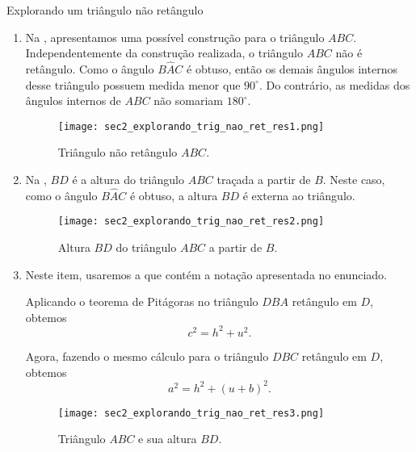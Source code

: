 \begin{answer}{Explorando um triângulo não retângulo}
{
\begin{enumerate}
    \item{}
    Na  , apresentamos uma possível construção para o triângulo $ABC$. Independentemente da construção realizada, o triângulo $ABC$ não é retângulo. Como o ângulo $B\hat{A}C$ é obtuso, então os demais ângulos internos desse triângulo possuem medida menor que $90^\circ$. Do contrário, as medidas dos ângulos internos de $ABC$ não somariam $180^\circ$.
    
    \begin{figure}[H]
    \centering
    \texttt{[image: sec2\_explorando\_trig\_nao\_ret\_res1.png]}
    \caption{Triângulo não retângulo $ABC$.}
    \label{sec2_trignaoret_resl_fig}
\end{figure}
    
    \item{}
    Na , $BD$ é a  altura do triângulo $ABC$ traçada a partir de $B$. Neste caso, como o ângulo $B\hat{A}C$ é obtuso, a altura $BD$ é externa ao triângulo.
    \begin{figure}[H]
    \centering
    \texttt{[image: sec2\_explorando\_trig\_nao\_ret\_res2.png]}
    \caption{Altura $BD$ do triângulo $ABC$ a partir de $B$.}
    \label{sec2_trignaoret_res2_fig}
\end{figure}
    
    \item{}
    Neste item, usaremos a   que contém a notação apresentada no enunciado.
   
    Aplicando o teorema de Pitágoras no triângulo $DBA$ retângulo em $D$, obtemos 
    \begin{equation}
     c^2=h^2+u^2.   \label{sec2_at_trignaoret_eq1}
    \end{equation}
    
    Agora, fazendo o mesmo cálculo para o triângulo $DBC$ retângulo em $D$, obtemos 
    \begin{equation}
     a^2=h^2+(u+b)^2.   \label{sec2_at_trignaoret_eq2}
    \end{equation}
    \begin{figure}[H]
    \centering
    \texttt{[image: sec2\_explorando\_trig\_nao\_ret\_res3.png]}
    \caption{Triângulo $ABC$ e sua altura $BD$.}
    \label{sec2_trignaoret_res3_fig}
\end{figure}
    

\end{enumerate}}
\end{answer}
